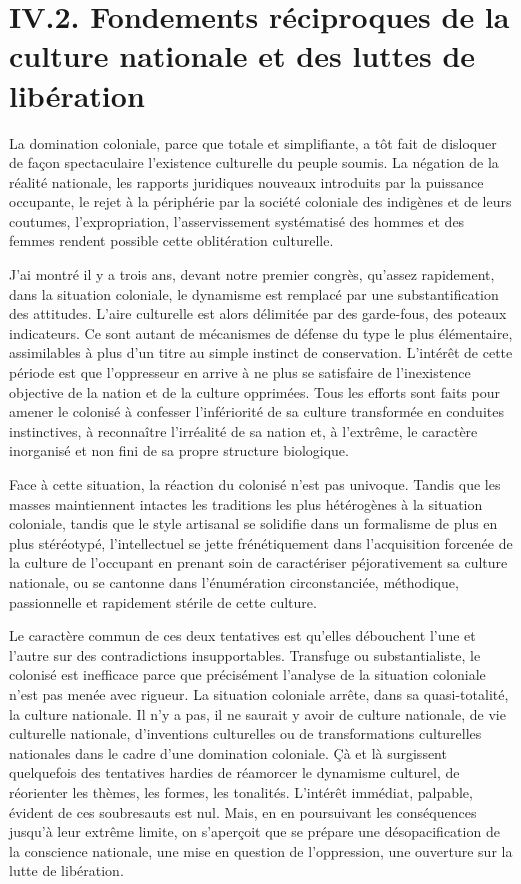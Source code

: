 \documentclass[french,twoside]{book} %
\begin{document}
 \section[{IV.2. Fondements réciproques de la culture nationale et des luttes de libération}]{IV.2. Fondements réciproques de la culture nationale et des luttes de libération}
\noindent La domination coloniale, parce que totale et simplifiante, a tôt fait de disloquer de façon spectaculaire l’existence culturelle du peuple soumis. La négation de la réalité nationale, les rapports juridiques nouveaux introduits par la puissance occupante, le rejet à la périphérie par la société coloniale des indigènes et de leurs coutumes, l’expropriation, l’asservissement systématisé des hommes et des femmes rendent possible cette oblitération culturelle.\par
\bigbreak
\noindent J’ai montré il y a trois ans, devant notre premier congrès, qu’assez rapidement, dans la situation coloniale, le dynamisme est remplacé par une substantification des attitudes. L’aire culturelle est alors délimitée par des garde-fous, des poteaux indicateurs. Ce sont autant de mécanismes de défense du type le plus élémentaire, assimilables à plus d’un titre au simple instinct de conservation. L’intérêt de cette période est que l’oppresseur en arrive à ne plus se satisfaire de l’inexistence objective de la nation et de la culture opprimées. Tous les efforts sont faits pour amener le colonisé à confesser l’infériorité de sa culture transformée en conduites instinctives, à reconnaître l’irréalité de sa nation et, à l’extrême, le caractère inorganisé et non fini de sa propre structure biologique.\par
Face à cette situation, la réaction du colonisé n’est pas univoque. Tandis que les masses maintiennent intactes les traditions les plus hétérogènes à la situation coloniale, tandis que le style artisanal se solidifie dans un formalisme de plus en plus   stéréotypé, l’intellectuel se jette frénétiquement dans l’acquisition forcenée de la culture de l’occupant en prenant soin de caractériser péjorativement sa culture nationale, ou se cantonne dans l’énumération circonstanciée, méthodique, passionnelle et rapidement stérile de cette culture.\par
\bigbreak
\noindent Le caractère commun de ces deux tentatives est qu’elles débouchent l’une et l’autre sur des contradictions insupportables. Transfuge ou substantialiste, le colonisé est inefficace parce que précisément l’analyse de la situation coloniale n’est pas menée avec rigueur. La situation coloniale arrête, dans sa quasi-totalité, la culture nationale. Il n’y a pas, il ne saurait y avoir de culture nationale, de vie culturelle nationale, d’inventions culturelles ou de transformations culturelles nationales dans le cadre d’une domination coloniale. Çà et là surgissent quelquefois des tentatives hardies de réamorcer le dynamisme culturel, de réorienter les thèmes, les formes, les tonalités. L’intérêt immédiat, palpable, évident de ces soubresauts est nul. Mais, en en poursuivant les conséquences jusqu’à leur extrême limite, on s’aperçoit que se prépare une désopacification de la conscience nationale, une mise en question de l’oppression, une ouverture sur la lutte de libération.\par
\end{document}
